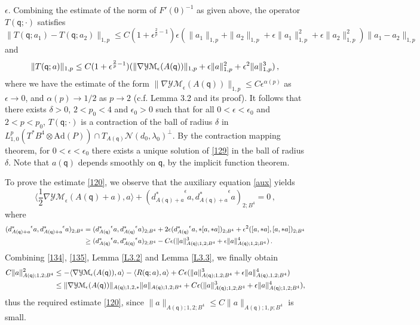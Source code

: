 \documentclass[11pt]{article}
\numberwithin{equation}{section} \setlength{\topmargin}{-35pt}
\newcommand{\Ad}{\text{Ad}}
\newcommand{\YMe}{\mathcal{YM}_{\epsilon}}
\newcommand{\q}{\mathsf{q}}
\begin{document}
$\epsilon$. Combining the estimate of the norm of $F'(0)^{-1}$ as
given above, the operator  $T(\q;\cdot)$ satisfies
$$\|T(\q;a_1)-T(\q;a_2)\|_{1,p}\le C(1+\epsilon^{\frac{2}{p}-1})\epsilon(\|a_1\|_{1,p}+\|a_2\|_{1,p}+\epsilon\|a_1\|_{1,p}^2+\epsilon\|a_2\|_{1,p}^2)\|a_1-a_2\|_{1,p}$$
and
\begin{equation}
\notag \|T(\q;a)\|_{1,p}\le
C(1+\epsilon^{\frac{2}{p}-1})(\|\nabla\YMe(A(\q))\|_{1,p}+\epsilon\|a\|_{1,p}^2+\epsilon^2\|a\|_{1,p}^3)\,,
\end{equation}
where we have the estimate of the form
$\|\nabla\YMe(A(\q))\|_{1,p}\le C\epsilon^{\alpha(p)}$ as
$\epsilon\to 0$, and $\alpha(p)\to1/2$ as $p\to 2$ (c.f. Lemma 3.2
and its proof). It follows that there exists $\delta>0$, $2<p_0<4$
and $\epsilon_0>0$ such that for all $0<\epsilon<\epsilon_0$ and
$2<p<p_0$, $T(\q;\cdot)$ is a contraction of the ball of radius
$\delta$ in $L^p_{1,0}(T^{\ast}B^4\otimes\Ad(P))\cap
T_{A(\q)}\mathcal{N}(d_0,\lambda_0)^{\perp}$. By the contraction
mapping theorem, for $0<\epsilon<\epsilon_0$ there exists a unique
solution of \eqref{129} in the ball of radius $\delta$. Note that
$a(\q)$ depends smoothly on $\q$, by the implicit function theorem.

\noindent To prove the estimate \eqref{120}, we observe that the
auxiliary equation \eqref{aux} yields
\begin{equation}
\label{134}
\Big\langle\frac{1}{2}\nabla\YMe(A(\q)+a),a\Big\rangle+({d_{A(\q)+a}^{\ast}}^{\epsilon}a,{d_{A(\q)+a}^{\ast}}^{\epsilon}a)_{2;B^4}=0\,,
\end{equation}
where
\begin{align}
\label{135}
({d_{A(\q)+a}^{\ast}}^{\epsilon}a,{d_{A(\q)+a}^{\ast}}^{\epsilon}a)_{2;B^4}&=({d_{A(\q)}^{\ast}}^{\epsilon}a,{d_{A(\q)}^{\ast}}^{\epsilon}a)_{2;B^4}+
2\epsilon({d_{A(\q)}^{\ast}}^{\epsilon}a,\ast[a,\ast a])_{2;B^4}
+\epsilon^2([a,\ast a],[a,\ast a])_{2;B^4}\notag\\
&\ge({d_{A(\q)}^{\ast}}^{\epsilon}a,{d_{A(\q)}^{\ast}}^{\epsilon}a)_{2;B^4}-C\epsilon(\|a\|_{A(\q);1,2;B^4}^3+\epsilon\|a\|_{A(\q);1,2;B^4}^4)\,.
\end{align}
Combining \eqref{134}, \eqref{135}, Lemma \ref{L3.2} and Lemma
\ref{L3.3}, we finally obtain
\begin{align}
C\|a\|_{A(\q);1,2;B^4}^2&\le
-\langle\nabla\YMe(A(\q)),a\rangle-\langle R(\q;a),a\rangle
+C\epsilon(\|a\|_{A(\q);1,2;B^4}^3+\epsilon\|a\|_{A(\q),1,2;B^4}^4)\notag\\
&\le \|\nabla\YMe(A(\q))\|_{A(\q);1,2,\ast}\|a\|_{A(\q);1,2;B^4}
+C\epsilon(\|a\|_{A(\q);1,2;B^4}^3+\epsilon\|a\|_{A(\q);1,2;B^4}^4),\notag
\end{align}
thus the required estimate \eqref{120}, since
$\|a\|_{A(\q);1,2;B^4}\le C\|a\|_{A(\q);1,p;B^4}$ is small.
\end{document}
